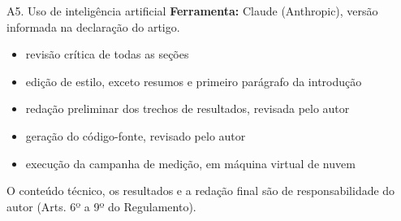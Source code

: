 \documentclass[aspectratio=169,10pt,xcolor={table}]{beamer}
\begin{document}
\begin{frame}{A5. Uso de inteligência artificial}
  \textbf{Ferramenta:} Claude (Anthropic), versão informada na declaração do artigo.
  \vskip2mm
  \begin{itemize}
    \item revisão crítica de todas as seções
    \item edição de estilo, exceto resumos e primeiro parágrafo da introdução
    \item redação preliminar dos trechos de resultados, revisada pelo autor
    \item geração do código-fonte, revisado pelo autor
    \item execução da campanha de medição, em máquina virtual de nuvem
  \end{itemize}
  \vskip3mm
  O conteúdo técnico, os resultados e a redação final são de responsabilidade do autor (Arts. 6º a 9º do Regulamento).
\end{frame}
\end{document}
